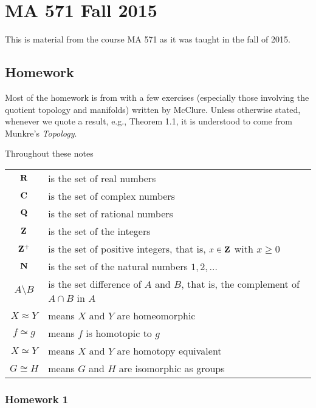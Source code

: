 \section{MA 571 Fall 2015}
This is material from the course MA 571 as it was taught in the fall of
2015.%
\bigskip
\subsection{Homework}
 Most of the homework is from \cite{munkres} with a few exercises
(especially those involving the quotient topology and manifolds) written by
McClure. Unless otherwise stated, whenever we quote a result, e.g., Theorem
1.1, it is understood to come from Munkre's \emph{Topology}.

Throughout these notes

\begin{tabular}{cl}
  $\mathbf{R}$ & is the set of real numbers\\
  $\mathbf{C}$ & is the set of complex numbers\\
  $\mathbf{Q}$ & is the set of rational numbers\\
  $\mathbf{Z}$ & is the set of the integers\\
  $\mathbf{Z}^+$ & is the set of positive integers, that is, $x\in\mathbf{Z}$ with
             $x\geq 0$\\
  $\mathbf{N}$ & is the set of the natural numbers $1,2,\ldots$\\
  $A\setminus B$ & is the set difference of $A$ and $B$, that is, the
                        complement of $A\cap B$ in $A$\\
  $X\approx Y$& means $X$ and $Y$ are homeomorphic\\
  $f\simeq g$& means $f$ is homotopic to $g$\\
  $X\simeq Y$&means $X$ and $Y$ are homotopy equivalent\\
  $G\cong H$& means $G$ and $H$ are isomorphic as groups
\end{tabular}

\newpage
\subsubsection{Homework 1}
\setcounter{exercise}{0}
\setcounter{equation}{0}


